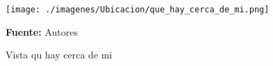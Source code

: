 \begin{figure}[!htb]
  \begin{center}
\texttt{[image: ./imagenes/Ubicacion/que\_hay\_cerca\_de\_mi.png]}
    \caption{Vista qu hay cerca de mi}
    \label{fig:Vista_que_hay_cerca_de_mi}
    \textbf{Fuente:}  Autores
  \end{center}
\end{figure}
